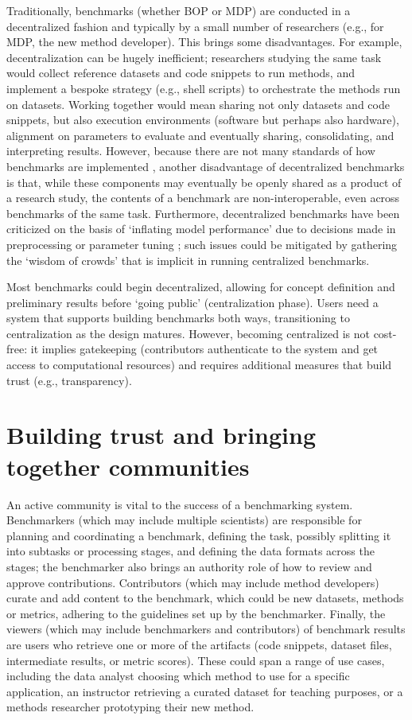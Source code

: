 \documentclass[11pt]{article}
\begin{document}
Traditionally, benchmarks (whether BOP or MDP) are conducted in a decentralized fashion and typically by a small number of researchers (e.g., for MDP, the new method developer). This brings some disadvantages. For example, decentralization can be hugely inefficient; researchers studying the same task would collect reference datasets and code snippets to run methods, and implement a bespoke strategy (e.g., shell scripts) to orchestrate the methods run on datasets. Working together would mean sharing not only datasets and code snippets, but also execution environments (software but perhaps also hardware), alignment on parameters to evaluate and eventually sharing, consolidating, and interpreting results. However, because there are not many standards of how benchmarks are implemented \cite{Sonrel2023-te}, another disadvantage of decentralized benchmarks is that, while these components may eventually be openly shared as a product of a research study, the contents of a benchmark are non-interoperable, even across benchmarks of the same task. Furthermore, decentralized benchmarks have been criticized on the basis of `inflating model performance' due to decisions made in preprocessing or parameter tuning \cite{Luecken2024-fk}; such issues could be mitigated by gathering the `wisdom of crowds' that is implicit in running centralized benchmarks.

Most benchmarks could begin decentralized, allowing for concept definition and preliminary results before `going public' (centralization phase). Users need a system that supports building benchmarks both ways, transitioning to centralization as the design matures. However, becoming centralized is not cost-free: it implies gatekeeping (contributors authenticate to the system and get access to computational resources) and requires additional measures that build trust (e.g., transparency).

\section*{Building trust and bringing together communities}

An active community is vital to the success of a benchmarking system. Benchmarkers (which may include multiple scientists) are responsible for planning and coordinating a benchmark, defining the task, possibly splitting it into subtasks or processing stages, and defining the data formats across the stages; the benchmarker also brings an authority role of how to review and approve contributions. Contributors (which may include method developers) curate and add content to the benchmark, which could be new datasets, methods or metrics, adhering to the guidelines set up by the benchmarker. Finally, the viewers (which may include benchmarkers and contributors) of benchmark results are users who retrieve one or more of the artifacts (code snippets, dataset files, intermediate results, or metric scores). These could span a range of use cases, including the data analyst choosing which method to use for a specific application, an instructor retrieving a curated dataset for teaching purposes, or a methods researcher prototyping their new method.
\end{document}
